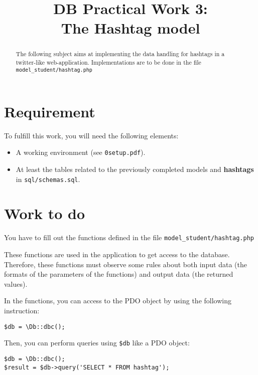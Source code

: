 \documentclass[twoside,a4paper,12pt]{article}
\title{DB Practical Work 3:\\The Hashtag model}
\date{}
\begin{document}
\maketitle

\begin{abstract}
  The following subject aims at implementing the data handling for hashtags in a twitter-like web-application. Implementations are to be done in the file \texttt{model\_student/hashtag.php}
\end{abstract}

\tableofcontents

\clearpage

\section{Requirement}
To fulfill this work, you will need the following elements:

\begin{itemize}
\item A working environment (see \texttt{0setup.pdf}).
\item At least the tables related to the previously completed models and \textbf{hashtags} in \texttt{sql/schemas.sql}.
\end{itemize}

\section{Work to do}
You have to fill out the functions defined in the file \texttt{model\_student/hashtag.php}

These functions are used in the application to get access to the database. Therefore, these functions must observe some rules about both input data (the formats of the parameters of the functions) and output data (the returned values).

In the functions, you can access to the PDO object by using the following instruction:

\begin{lstlisting}
$db = \Db::dbc();
\end{lstlisting}

Then, you can perform queries using \texttt{\$db} like a PDO object:
\begin{lstlisting}
$db = \Db::dbc();
$result = $db->query('SELECT * FROM hashtag');
\end{lstlisting}
\end{document}
